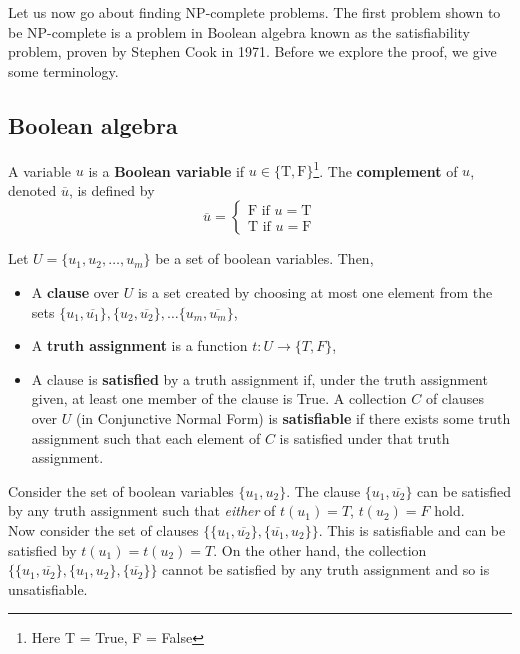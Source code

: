 Let us now go about finding NP-complete problems. The first problem shown to be NP-complete is a problem in Boolean algebra known as the satisfiability problem, proven by Stephen Cook in 1971. Before we explore the proof, we give some terminology.

\subsection{Boolean algebra}

\begin{definition}
    A variable $u$ is a \textbf{Boolean variable} if $u \in \{\text{T},\text{F}\}$\footnote{Here T = True, F = False}. The \textbf{complement} of $u$, denoted $\overline{u}$, is defined by
    \begin{equation*}
        \overline{u} =
        \begin{cases}
            \text{F if $u=\text{T}$}\\
            \text{T if $u=\text{F}$}
        \end{cases}
    \end{equation*}
\end{definition}

\begin{definition}
    Let $U = \{u_1,u_2,\dots,u_m\}$ be a set of boolean variables. Then,

    \begin{itemize}
        \item A \textbf{clause} over $U$ is a set created by choosing at most one element from the sets \newline $\{u_1,\overline{u_1}\},\{u_2,\overline{u_2}\},\dots\{u_m,\overline{u_m}\}$,

        \item A \textbf{truth assignment} is a function $t:U \to \{T,F\}$,

        \item A clause is \textbf{satisfied} by a truth assignment if, under the truth assignment given, at least one member of the clause is True. A collection $C$ of clauses over $U$ (in Conjunctive Normal Form) is \textbf{satisfiable} if there exists some truth assignment such that each element of $C$ is satisfied under that truth assignment.
    \end{itemize}
\end{definition}

\begin{example}
    Consider the set of boolean variables $\{u_1,u_2\}$. The clause $\{u_1,\overline{u_2}\}$ can be satisfied by any truth assignment such that \textit{either} of $t(u_1)=T$, $t(u_2) = F$ hold.\\

    Now consider the set of clauses $\{\{u_1,\overline{u_2}\},\{\overline{u_1},u_2\}\}$. This is satisfiable and can be satisfied by $t(u_1) = t(u_2) = T$. On the other hand, the collection $\{\{u_1,\overline{u_2}\},\{u_1,u_2\},\{\overline{u_2}\}\}$ cannot be satisfied by any truth assignment and so is unsatisfiable.
\end{example}

